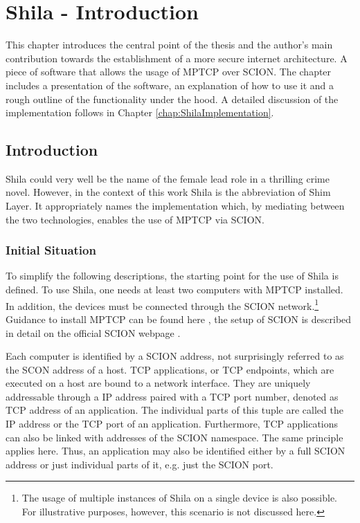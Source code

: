 
\chapter{Shila - Introduction}
\label{chap:ShilaIntroduction}

This chapter introduces the central point of the thesis and the author's main contribution towards the establishment of a more secure internet architecture. A piece of software that allows the usage of MPTCP over SCION. The chapter includes a presentation of the software, an explanation of how to  use it and a rough outline of the functionality under the hood. A detailed discussion of the implementation follows in Chapter \ref{chap:ShilaImplementation}.   

\section{Introduction}
\label{sec:ShilaIntroduction}

Shila could very well be the name of the female lead role in a thrilling crime novel. However, in the context of this work Shila is the abbreviation of Shim Layer. It appropriately names the implementation which, by mediating between the two technologies, enables the use of MPTCP via SCION.

\subsection*{Initial Situation}
\label{subsec:ShilaInitialSituation}

To simplify the following descriptions, the starting point for the use of Shila is defined. To use Shila, one needs at least two computers with MPTCP installed. In addition, the devices must be connected through the SCION network.\footnote{The usage of multiple instances of Shila on a single device is also possible. For illustrative purposes, however, this scenario is not discussed here.} Guidance to install MPTCP can be found here \cite{MPTCPWebMain}, the setup of SCION is described in detail on the official SCION webpage \cite{SCIONWebMain}.

Each computer is identified by a SCION address, not surprisingly referred to as the SCON address of a host. TCP applications, or TCP endpoints, which are executed on a host are bound to a network interface. They are uniquely addressable through a IP address paired with a TCP port number, denoted as TCP address of an application. The individual parts of this tuple are called the IP address or the TCP port of an application. Furthermore, TCP applications can also be linked with addresses of the SCION namespace. The same principle applies here. Thus, an application may also be identified either by a full SCION address or just individual parts of it, e.g. just the SCION port.

